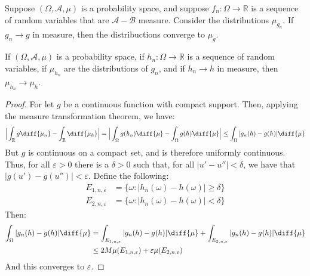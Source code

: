             Suppose $(\Omega,\mathcal{A},\mu)$ is a probability space,
            and suppose $f_{n}:\Omega\rightarrow\mathbb{R}$ is a
            sequence of random variables that are
            $\mathcal{A}-\mathcal{B}$ measure. Consider the
            distributions $\mu_{g_{n}}$. If $g_{n}\rightarrow{g}$ in
            measure, then the distribuctions converge to $\mu_{g}$.
            \begin{theorem}
                If $(\Omega,\mathcal{A},\mu)$ is a probability space,
                if $h_{n}:\Omega\rightarrow\mathbb{R}$ is a
                sequence of random variables, if $\mu_{h_{n}}$ are the
                distributions of $g_{n}$, and if $h_{n}\rightarrow{h}$
                in measure, then $\mu_{h_{n}}\rightarrow\mu_{h}$.
            \end{theorem}
            \begin{proof}
                For let $g$ be a continuous function with compact
                support. Then, applying the measure transformation
                theorem, we have:
                \begin{equation}
                    \Big|\int_{\mathbb{R}}g\diff{\mu_{n}}-
                        \int_{\mathbb{R}}\diff{\mu_{h}}\Big|
                    =\Big|\int_{\Omega}g(h_{n})\diff{\mu}-
                        \int_{\Omega}g(h)\diff{\mu}\Big|
                    \leq\int_{\Omega}|g_{n}(h)-g(h)|\diff{\mu}
                \end{equation}
                But $g$ is continuous on a compact set, and is
                therefore uniformly continuous. Thus, for all
                $\varepsilon>0$ there is a $\delta>0$ such that, for
                all $|u'-u''|<\delta$, we have that
                $|g(u')-g(u'')|<\varepsilon$. Define the following:
                \begin{align}
                    E_{1,n,\varepsilon}
                    &=\{\omega:|h_{n}(\omega)-h(\omega)|\geq\delta\}\\
                    E_{2,n,\varepsilon}
                    &=\{\omega:|h_{n}(\omega)-h(\omega)|<\delta\}
                \end{align}
                Then:
                \begin{align}
                    \int_{\Omega}|g_{n}(h)-g(h)|\diff{\mu}
                    &=\int_{E_{1,n,\varepsilon}}|g_{n}(h)-g(h)|\diff{\mu}
                    +\int_{E_{2,n,\varepsilon}}
                        |g_{n}(h)-g(h)|\diff{\mu}\\
                    &\leq{2}M\mu(E_{1,n,\varepsilon})+
                        \varepsilon\mu(E_{2,n,\varepsilon})
                \end{align}
                And this converges to $\varepsilon$.
            \end{proof}
